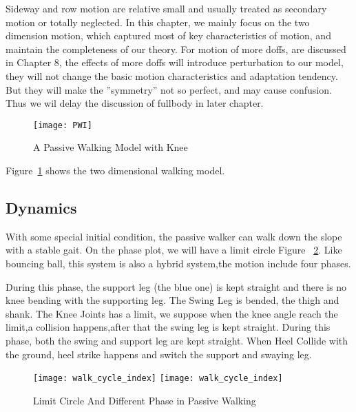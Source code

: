 Sideway and row motion are relative small and usually treated as secondary motion or totally neglected.
In this chapter, we mainly focus on the two dimension motion, which captured most of key characteristics of motion, and maintain the completeness of our theory.
For motion of more doffs, are discussed in Chapter 8, the effects of more doffs will introduce perturbation to our model, they will not change the basic motion characteristics and adaptation tendency.
But they will make the ''symmetry'' not so perfect, and may cause confusion.
Thus we wil delay the discussion of fullbody in later chapter.

\begin{figure}[!htbp]
  \begin{center}
      \texttt{[image: PWI]}
    \caption{A Passive Walking Model with Knee}
    \label{fig:passivekneewalker}
\end{center}
\end{figure}


Figure~\ref{fig:passivekneewalker} shows the two dimensional walking model.
\subsection*{Dynamics}
With some special initial condition, the passive walker can walk down the slope with a stable gait.
On the phase plot, we will have a limit circle Figure ~\ref{fig:fourphaselimitcycle}.
Like bouncing ball, this system is also a hybrid system,the motion include four phases\citep{Chen2007}.
\begin{itemize}
During this phase, the support leg (the blue one) is kept straight and there is no knee bending with the supporting leg.
The Swing Leg is bended, the thigh and shank.
The Knee Joints has a limit, we suppose when the knee angle reach the limit,a collision happens,after that the swing leg is kept straight.
During this phase, both the swing and support leg are kept straight.
When Heel Collide with the ground, heel strike happens and switch the support and swaying leg.
\end{itemize}

\begin{figure}[!htbp]
  \begin{center}
    \leavevmode
    \ifpdf
      \texttt{[image: walk\_cycle\_index]}
    \else
      \texttt{[image: walk\_cycle\_index]}
    \fi
    \caption{Limit Circle And Different Phase in Passive Walking}
    \label{fig:fourphaselimitcycle}
\end{center}
\end{figure}


